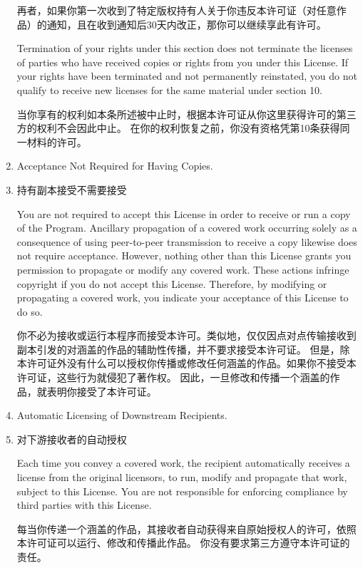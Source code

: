 \documentclass[11pt]{article}
\begin{document}
\begin{enumerate}
        再者，如果你第一次收到了特定版权持有人关于你违反本许可证（对任意作品）的通知，且在收到通知后30天内改正，那你可以继续享此有许可。

        Termination of your rights under this section does not terminate the
        licenses of parties who have received copies or rights from you under
        this License.  If your rights have been terminated and not permanently
        reinstated, you do not qualify to receive new licenses for the same
        material under section 10.

        当你享有的权利如本条所述被中止时，根据本许可证从你这里获得许可的第三方的权利不会因此中止。
        在你的权利恢复之前，你没有资格凭第10条获得同一材料的许可。

  \item Acceptance Not Required for Having Copies.
  \item 持有副本接受不需要接受

        You are not required to accept this License in order to receive or
        run a copy of the Program.  Ancillary propagation of a covered work
        occurring solely as a consequence of using peer-to-peer transmission
        to receive a copy likewise does not require acceptance.  However,
        nothing other than this License grants you permission to propagate or
        modify any covered work.  These actions infringe copyright if you do
        not accept this License.  Therefore, by modifying or propagating a
        covered work, you indicate your acceptance of this License to do so.

        你不必为接收或运行本程序而接受本许可。类似地，仅仅因点对点传输接收到副本引发的对涵盖的作品的辅助性传播，并不要求接受本许可证。
        但是，除本许可证外没有什么可以授权你传播或修改任何涵盖的作品。如果你不接受本许可证，这些行为就侵犯了著作权。
        因此，一旦修改和传播一个涵盖的作品，就表明你接受了本许可证。

  \item Automatic Licensing of Downstream Recipients.
  \item 对下游接收者的自动授权

        Each time you convey a covered work, the recipient automatically
        receives a license from the original licensors, to run, modify and
        propagate that work, subject to this License.  You are not responsible
        for enforcing compliance by third parties with this License.

        每当你传递一个涵盖的作品，其接收者自动获得来自原始授权人的许可，依照本许可证可以运行、修改和传播此作品。
        你没有要求第三方遵守本许可证的责任。


\end{enumerate}
\end{document}
